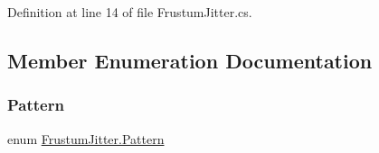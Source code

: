 Definition at line 14 of file Frustum\+Jitter.\+cs.



\subsection{Member Enumeration Documentation}
\mbox{\label{class_frustum_jitter_a11a9007fdc6ca37500098c619213e3d3}} 
\subsubsection{\texorpdfstring{Pattern}{Pattern}}
{\footnotesize\ttfamily enum \mbox{\hyperlink{class_frustum_jitter_a11a9007fdc6ca37500098c619213e3d3}{Frustum\+Jitter.\+Pattern}}\hspace{0.3cm}{\ttfamily [strong]}}

